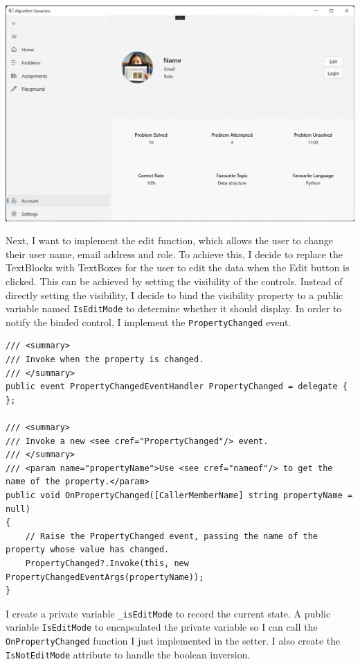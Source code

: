 \documentclass[a4paper]{report}
\begin{document}
\includegraphics[width=\textwidth, height=\textheight, keepaspectratio]{AccountPage-Layout}

Next, I want to implement the edit function, which allows the user to change their user name, email address and role. To achieve this, I decide to replace the TextBlocks with TextBoxes for the user to edit the data when the Edit button is clicked. This can be achieved by setting the visibility of the controls. Instead of directly setting the visibility, I decide to bind the visibility property to a public variable named \verb|IsEditMode| to determine whether it should display. In order to notify the binded control, I implement the \verb|PropertyChanged| event\cite{microsoft:docs:data-binding-in-depth}.

\begin{verbatim}
/// <summary>
/// Invoke when the property is changed.
/// </summary>
public event PropertyChangedEventHandler PropertyChanged = delegate { };

/// <summary>
/// Invoke a new <see cref="PropertyChanged"/> event.
/// </summary>
/// <param name="propertyName">Use <see cref="nameof"/> to get the name of the property.</param>
public void OnPropertyChanged([CallerMemberName] string propertyName = null)
{
    // Raise the PropertyChanged event, passing the name of the property whose value has changed.
    PropertyChanged?.Invoke(this, new PropertyChangedEventArgs(propertyName));
}
\end{verbatim}

I create a private variable \verb|_isEditMode| to record the current state. A public variable \verb|IsEditMode| to encapsulated the private variable so I can call the \verb|OnPropertyChanged| function I just implemented in the setter. I also create the \verb|IsNotEditMode| attribute to handle the boolean inversion.
\end{document}
